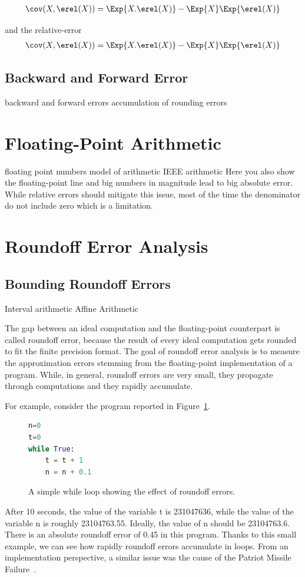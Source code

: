 \begin{align}
\cov(X,\erel(X)) = \Exp{X.\erel(X)}-\Exp{X}\Exp{\erel(X)}
\end{align}

%
and the relative-error
%
\begin{align}
\cov(X,\erel(X)) = \Exp{X.\erel(X)}-\Exp{X}\Exp{\erel(X)}
\end{align}
%

\subsection{Backward and Forward Error}
backward and forward errors
accumulation of rounding errors
\section{Floating-Point Arithmetic}
floating point numbers
model of arithmetic IEEE arithmetic
Here you also show the floating-point line and big numbers in magnitude lead to big absolute error. While relative errors should mitigate this issue, most of the time the denominator do not include zero which is a limitation.
\section{Roundoff Error Analysis}
\subsection{Bounding Roundoff Errors}
%
Interval arithmetic 
Affine Arithmetic

%
The gap between an ideal computation and the floating-point counterpart is called roundoff error, because the result of every ideal computation gets rounded to fit the finite precision format.
%
The goal of roundoff error analysis is to measure the approximation errors stemming from the floating-point implementation of a program.
%
While, in general, roundoff errors are very small, they propagate through computations and they rapidly accumulate.
%

For example, consider the program reported in Figure~\ref{fig:while}.

%
\begin{figure}[h!]
	\begin{lstlisting}[frame=single, language=Python]
n=0
t=0
while True:
	t = t + 1
	n = n + 0.1
	\end{lstlisting}
	\caption{A simple while loop showing the effect of roundoff errors.}\label{fig:while}
\end{figure}
%
After 10 seconds, the value of the variable t is 231047636, while the value of the variable n is roughly 23104763.55.
%
Ideally, the value of n should be 23104763.6.
%
There is an absolute roundoff error of 0.45 in this program.
%
Thanks to this small example, we can see how rapidly roundoff errors accumulate in loops. 
%
From an implementation perspective, a similar issue was the cause of the Patriot Missile Failure~\cite{patriot}.
%

